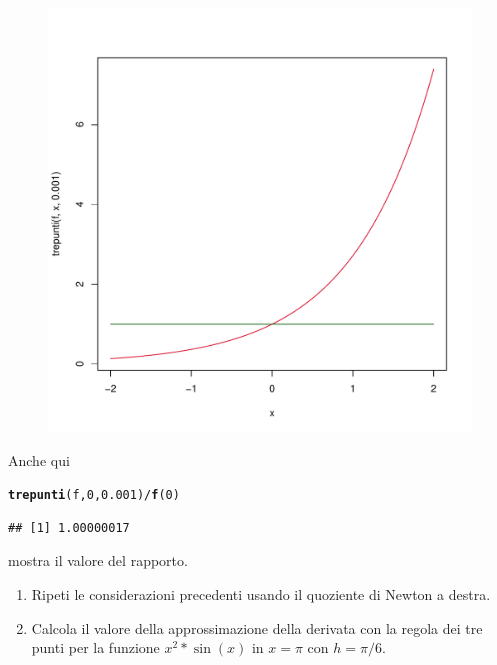 \documentclass[onecolumn,11pt]{book}\usepackage[]{graphicx}\usepackage[]{color}
\makeatletter
\def\maxwidth{ %
  \ifdim\Gin@nat@width>\linewidth
    \linewidth
  \else
    \Gin@nat@width
  \fi
}
\newcommand{\hlnum}[1]{\textcolor[rgb]{0.686,0.059,0.569}{#1}}%
\newcommand{\hlopt}[1]{\textcolor[rgb]{0,0,0}{#1}}%
\newcommand{\hlstd}[1]{\textcolor[rgb]{0.345,0.345,0.345}{#1}}%
\newcommand{\hlkwd}[1]{\textcolor[rgb]{0.737,0.353,0.396}{\textbf{#1}}}%
\newenvironment{kframe}{%
 \def\at@end@of@kframe{}%
 \ifinner\ifhmode%
  \def\at@end@of@kframe{\end{minipage}}%
  \begin{minipage}{\columnwidth}%
 \fi\fi%
 \def\FrameCommand##1{\hskip\@totalleftmargin \hskip-\fboxsep
 \colorbox{shadecolor}{##1}\hskip-\fboxsep
     \hskip-\linewidth \hskip-\@totalleftmargin \hskip\columnwidth}%
 \MakeFramed {\advance\hsize-\width
   \@totalleftmargin\z@ \linewidth\hsize
   \@setminipage}}%
 {\par\unskip\endMakeFramed%
 \at@end@of@kframe}
\newenvironment{knitrout}{}{} %
\makeatother
\begin{document}
\begin{figure}
\begin{center}
\begin{knitrout}
\color{fgcolor}
\includegraphics[width=\maxwidth]{figure/unnamed-chunk-127-1} 

\end{knitrout}
\end{center}
\end{figure}

Anche qui
\begin{knitrout}
\color{fgcolor}\begin{kframe}
\begin{alltt}
\hlkwd{trepunti}\hlstd{(f,}\hlnum{0}\hlstd{,}\hlnum{0.001}\hlstd{)}\hlopt{/}\hlkwd{f}\hlstd{(}\hlnum{0}\hlstd{)}
\end{alltt}
\begin{verbatim}
## [1] 1.00000017
\end{verbatim}
\end{kframe}
\end{knitrout}
mostra il valore del rapporto.

\begin{shaded}
\begin{enumerate}
 \item{ }Ripeti le considerazioni precedenti usando il quoziente di Newton a destra.
\item{} Calcola il valore della approssimazione della derivata con la regola dei tre punti per la funzione $x^2*\sin(x)$ in $x=\pi$ con $h=\pi/6$.
\end{enumerate}
\end{shaded}
\end{document}
